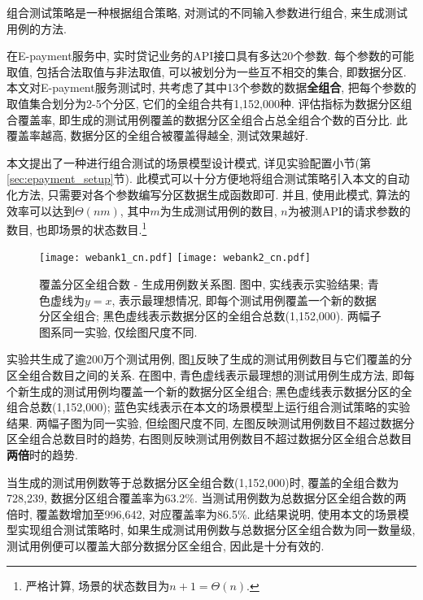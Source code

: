                 \label{sec:partition}
                
                组合测试策略\cite{grindal2005combination}是一种根据组合策略, 对测试的不同输入参数进行组合, 来生成测试用例的方法.
                
                在E-payment服务中, 实时贷记业务的API接口具有多达20个参数. 每个参数的可能取值, 包括合法取值与非法取值, 可以被划分为一些互不相交的集合, 即数据分区. 本文对E-payment服务测试时, 共考虑了其中13个参数的数据\textbf{全组合}, 把每个参数的取值集合划分为2-5个分区,  它们的全组合共有1,152,000种. 评估指标为数据分区组合覆盖率, 即生成的测试用例覆盖的数据分区全组合占总全组合个数的百分比. 此覆盖率越高, 数据分区的全组合被覆盖得越全, 测试效果越好. 
                
                本文提出了一种进行组合测试的场景模型设计模式, 详见实验配置小节(第\ref{sec:epayment_setup}节). 此模式可以十分方便地将组合测试策略引入本文的自动化方法, 只需要对各个参数编写分区数据生成函数即可. 并且, 使用此模式, 算法的效率可以达到$\Theta(nm)$, 其中$m$为生成测试用例的数目, $n$为被测API的请求参数的数目, 也即场景的状态数目.\footnote{严格计算, 场景的状态数目为$n+1 = \Theta(n)$.}
                
                \begin{figure}[!htb]
                    \centering
                    \texttt{[image: webank1\_cn.pdf]}
                    \texttt{[image: webank2\_cn.pdf]}
                    \caption[覆盖分区全组合数 - 生成用例数关系图]{覆盖分区全组合数 - 生成用例数关系图. 图中, 实线表示实验结果; 青色虚线为$y=x$, 表示最理想情况, 即每个测试用例覆盖一个新的数据分区全组合; 黑色虚线表示数据分区的全组合总数(1,152,000). 两幅子图系同一实验, 仅绘图尺度不同.}
                    \label{fig:partition}
                \end{figure}
                
                实验共生成了逾200万个测试用例, 图\ref{fig:partition}反映了生成的测试用例数目与它们覆盖的分区全组合数目之间的关系. 在图中, 青色虚线表示最理想的测试用例生成方法, 即每个新生成的测试用例均覆盖一个新的数据分区全组合; 黑色虚线表示数据分区的全组合总数(1,152,000); 蓝色实线表示在本文的场景模型上运行组合测试策略的实验结果. 两幅子图为同一实验, 但绘图尺度不同, 左图反映测试用例数目不超过数据分区全组合总数目时的趋势, 右图则反映测试用例数目不超过数据分区全组合总数目\textbf{两倍}时的趋势.
                
                当生成的测试用例数等于总数据分区全组合数(1,152,000)时, 覆盖的全组合数为728,239, 数据分区组合覆盖率为63.2\%. 当测试用例数为总数据分区全组合数的两倍时, 覆盖数增加至996,642, 对应覆盖率为86.5\%. 此结果说明, 使用本文的场景模型实现组合测试策略时, 如果生成测试用例数与总数据分区全组合数为同一数量级, 测试用例便可以覆盖大部分数据分区全组合, 因此是十分有效的.

